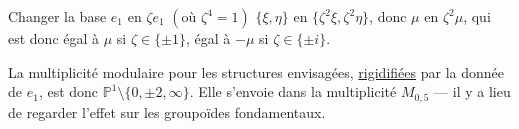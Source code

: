 Changer la base $e_1$ en $\zeta e_1$ $(\text{où }\zeta^4=1)$
$\{\xi,\eta\}$ en $\{\zeta^2\xi,\zeta^2\eta\}$, donc $\mu$ en
$\zeta^2\mu$, qui est donc égal à $\mu$ si $\zeta\in\{\pm1\}$,
égal à $-\mu$ si $\zeta\in\{\pm i\}$.

La multiplicité modulaire pour les structures envisagées,
\uline{rigidifiées} par la donnée de $e_1$, est donc
$\mathbb P^1\setminus\{0,\pm2,\infty\}$.
Elle s'envoie dans la multiplicité $M_{0,5}$ --- il y a lieu de
regarder l'effet sur les groupoïdes fondamentaux.
